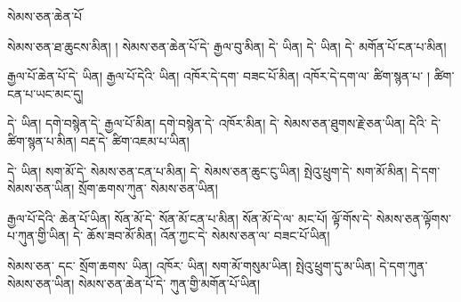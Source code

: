 \documentclass[12pt]{nextbook}
\begin{document}
\begin{readersection}{སེམས་ཅན་ཆེན་པོ}

 སེམས་ཅན་ཐ་ཆུངས་མིན།
  །
སེམས་ཅན་ཆེན་པོ་དེ་ རྒྱལ་བུ་མིན།
དེ་  ཡིན།
དེ་   ཡིན།
དེ་ མགོན་པོ་ངན་པ་མིན།

རྒྱལ་པོ་ཆེན་པོ་དེ་  ཡིན།
རྒྱལ་པོ་དེའི་   ཡིན།
འཁོར་དེ་དག་  བཟང་པོ་མིན།
འཁོར་དེ་དག་ལ་ ཚིག་སྙན་པ་ །
ཚིག་ངན་པ་ཡང་མང་དུ།

 དེ་  ཡིན།
དགེ་བསྙེན་དེ་ རྒྱལ་པོ་མིན།
དགེ་བསྙེན་དེ་ འཁོར་མིན།
དེ་ སེམས་ཅན་ཐུགས་རྗེ་ཅན་ཡིན།
དེའི་  དེ་ ཚིག་སྙན་པ་མིན།
བརྡ་དེ་ ཚིག་འཇམ་པ་ཡིན།

 དེ་  ཡིན།
སག་མོ་དེ་ སེམས་ཅན་ངན་པ་མིན།
 དེ་ སེམས་ཅན་ཆུང་ངུ་ཡིན།
སྤེའུ་ཕྲུག་དེ་ སག་མོ་མིན།
 དེ་དག་ སེམས་ཅན་ཡིན།
སྲོག་ཆགས་ཀུན་ སེམས་ཅན་ཡིན།

རྒྱལ་པོ་དེའི་  ཆེན་པོ་ཡིན།
སོན་མོ་དེ་ སོན་མོ་ངན་པ་མིན།
སོན་མོ་དེ་ལ་  མང་པོ།
ལྟོ་གོས་དེ་ སེམས་ཅན་ལྟོགས་པ་ཀུན་གྱི་ཡིན།
དེ་ ཆོས་ཟབ་མོ་མིན།
འོན་ཀྱང་དེ་ སེམས་ཅན་ལ་ བཟང་པོ་ཡིན།

སེམས་ཅན་  དང་ སྲོག་ཆགས་  ཡིན།
འཁོར་  ཡིན།
སག་མོ་གསུམ་ཡིན།
སྤེའུ་ཕྲུག་དུ་མ་ཡིན།
དེ་དག་ཀུན་ སེམས་ཅན་ཡིན།
སེམས་ཅན་ཆེན་པོ་དེ་ ཀུན་གྱི་མགོན་པོ་ཡིན།

\end{readersection}
\end{document}
